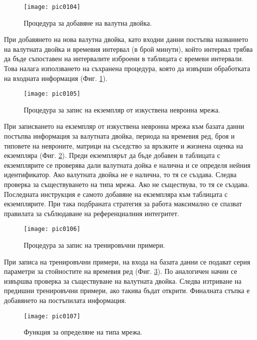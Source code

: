 \begin{figure}[h]
  \centering
  \texttt{[image: pic0104]}
  \caption{Процедура за добавяне на валутна двойка.}
\label{fig:pic0104}
\end{figure}
\FloatBarrier

При добавянето на нова валутна двойка, като входни данни постъпва названието на валутната двойка и времевия интервал (в брой минути), който интервал трябва да бъде съпоставен на интервалите изброени в таблицата с времеви интервали. Това налага използването на съхранена процедура, която да извърши обработката на входната информация (Фиг. \ref{fig:pic0104}). 

\begin{figure}[h]
  \centering
  \texttt{[image: pic0105]}
  \caption{Процедура за запис на екземпляр от изкуствена невронна мрежа.}
\label{fig:pic0105}
\end{figure}
\FloatBarrier

При записването на екземпляр от изкуствена невронна мрежа към базата данни постъпва информация за валутната двойка, периода на времевия ред, броя и типовете на невроните, матрици на съседство за връзките и жизнена оценка на екземпляра (Фиг. \ref{fig:pic0105}). Преди екземплярът да бъде добавен в таблицата с екземплярите се проверява дали валутната дойка е налична и се определя нейния идентификатор. Ако валутната двойка не е налична, то тя се създава. Следва проверка за съществуването на типа мрежа. Ако не съществува, то тя се създава. Последната инструкция е самото добавяне на екземпляра към таблицата с екземплярите. При така подбраната стратегия за работа максимално се спазват правилата за съблюдаване на референциалния интегритет. 

\begin{figure}[h]
  \centering
  \texttt{[image: pic0106]}
  \caption{Процедура за запис на тренировъчни примери.}
\label{fig:pic0106}
\end{figure}
\FloatBarrier

При записа на тренировъчни примери, на входа на базата данни се подават серия параметри за стойностите на времевия ред (Фиг. \ref{fig:pic0106}). По аналогичен начин се извършва проверка за съществуване на валутната двойка. Следва изтриване на предишни тренировъчни примери, ако такива бъдат открити. Финалната стъпка е добавянето на постъпилата информация. 

\begin{figure}[h]
  \centering
  \texttt{[image: pic0107]}
  \caption{Функция за определяне на типа мрежа.}
\label{fig:pic0107}
\end{figure}
\FloatBarrier

